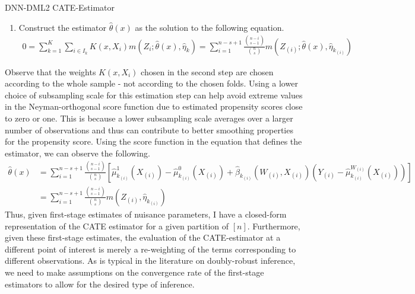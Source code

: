 \begin{boxD}
\begin{dfn}{DNN-DML2 CATE-Estimator}
\begin{enumerate}
			\item Construct the estimator $\hat{\theta}\left(x\right)$
			      as the solution to the following equation.
			      \begin{equation}
				      \begin{aligned}
					      0 = \sum_{k = 1}^{K} \sum_{i \in I_k} K(x, X_{i}) m\left(Z_{i}; \hat{\theta}\left(x\right), \hat{\eta}_{k}\right)
					      = \sum_{i = 1}^{n - s + 1} \frac{\binom{n-i}{s-1}}{\binom{n}{s}} m\left(Z_{(i)}; \hat{\theta}\left(x\right),\hat{\eta}_{k_{(i)}}\right)
				      \end{aligned}
			      \end{equation}
		\end{enumerate}
	\end{dfn}
\end{boxD}
Observe that the weights $K(x, X_{i})$ chosen in the second step are chosen according to the whole sample - not according to the chosen folds.
Using a lower choice of subsampling scale for this estimation step can help avoid extreme values in the Neyman-orthogonal score function due to estimated propensity scores close to zero or one.
This is because a lower subsampling scale averages over a larger number of observations and thus can contribute to better smoothing properties for the propensity score.
Using the score function in the equation that defines the estimator, we can observe the following.
\begin{equation}
	\begin{aligned}
		\hat{\theta}\left(x\right) 
        & = \sum_{i = 1}^{n - s + 1} \frac{\binom{n-i}{s-1}}{\binom{n}{s}}
		\left[\hat{\mu}_{k_{(i)}}^{1}\left(X_{(i)}\right) - \hat{\mu}_{k_{(i)}}^{0}\left(X_{(i)}\right) + \hat{\beta}_{k_{(i)}}\left(W_{(i)}, X_{(i)}\right)\left(Y_{(i)} - \hat{\mu}^{W_{(i)}}_{k_{(i)}}\left(X_{(i)}\right)\right)\right] \\
        & = \sum_{i = 1}^{n - s + 1} \frac{\binom{n-i}{s-1}}{\binom{n}{s}} m(Z_{(i)}, \hat{\eta}_{k_{(i)}})
	\end{aligned}
\end{equation}
Thus, given first-stage estimates of nuisance parameters, I have a closed-form representation of the CATE estimator for a given partition of $[n]$.
Furthermore, given these first-stage estimates, the evaluation of the CATE-estimator at a different point of interest is merely a re-weighting of the terms corresponding to different observations.
As is typical in the literature on doubly-robust inference, we need to make assumptions on the convergence rate of the first-stage estimators to allow for the desired type of inference.
